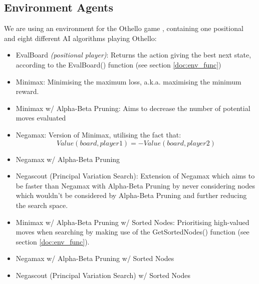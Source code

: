\documentclass{article}
\begin{document}
\subsection{\label{doc:env_agnts}Environment Agents}
We are using an environment for the Othello game \cite{codes}, containing one positional and eight different AI algorithms playing Othello:
\begin{itemize} 
    \item EvalBoard \textit{(positional player)}:   Returns the action giving the best next state, according to the EvalBoard() function (see section \ref{doc:env_func})
    \item Minimax:   Minimising the maximum loss, a.k.a. maximising the minimum reward.
    \item Minimax w/ Alpha-Beta Pruning:    Aims to decrease the number of potential moves evaluated
    \item Negamax:  Version of Minimax, utilising the fact that:
    \begin{equation*}
        Value(board, player 1) = -Value(board, player 2)
    \end{equation*}
    \item Negamax w/ Alpha-Beta Pruning
    \item Negascout (Principal Variation Search):  Extension of Negamax which aims to be faster than Negamax with Alpha-Beta Pruning by never considering nodes which wouldn’t be considered by Alpha-Beta Pruning and further reducing the search space.
    \item Minimax w/ Alpha-Beta Pruning w/ Sorted Nodes:    Prioritising high-valued moves when searching by making use of the GetSortedNodes() function (see section \ref{doc:env_func}).
    \item Negamax w/ Alpha-Beta Pruning w/ Sorted Nodes
    \item Negascout (Principal Variation Search) w/ Sorted Nodes 
\end{itemize}
\end{document}
